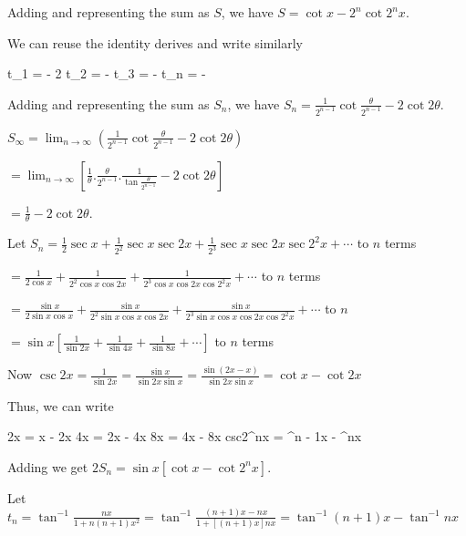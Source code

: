   Adding and representing the sum as $S$, we have $S = \cot x - 2^n\cot2^nx$.
\item We can reuse the identity derives and write similarly

  \startformula\startalign
    \NC t_1 \NC = \cot\theta - 2\theta\NR
    \NC t_2 \NC = \cot{} - \cot\theta\NR
    \NC t_3 \NC = \cot{} - \cot{}\NR
    \NC \NC \cdots\NR
    \NC t_n \NC = \cot{} - \cot{}\NR
  \stopalign\stopformula

  Adding and representing the sum as $S_n$, we have $S_n = \frac{1}{2^{n - 1}}\cot\frac{\theta}{2^{n - 1}} -
  2\cot2\theta$.

  $\displaystyle S_\infty = \lim_{n\to\infty}\left(\frac{1}{2^{n - 1}}\cot\frac{\theta}{2^{n - 1}} -
  2\cot2\theta\right)$

  $= \lim_{n\to\infty}\left[\frac{1}{\theta}.\frac{\theta}{2^{n - 1}}.\frac{1}{\tan\frac{\theta}{2^{n - 1}}}
    - 2\cot2\theta\right]$

  $= \frac{1}{\theta} - 2\cot2\theta$.
\item Let $S_n = \frac{1}{2}\sec x + \frac{1}{2^2}\sec x\sec2x + \frac{1}{2^3}\sec x\sec2x\sec2^2x +
  \cdots$ to $n$ terms

  $= \frac{1}{2\cos x} + \frac{1}{2^2\cos x\cos2x} + \frac{1}{2^3\cos x\cos2x\cos2^2x} + \cdots$ to $n$
  terms

  $= \frac{\sin x}{2\sin x\cos x} + \frac{\sin x}{2^2\sin x\cos x\cos2x} + \frac{\sin x}{2^3\sin x\cos
    x\cos2x\cos2^2x} + \cdots$ to $n$

  $= \sin x\left[\frac{1}{\sin 2x} + \frac{1}{\sin 4x} + \frac{1}{\sin 8x} + \cdots\right]$ to $n$ terms

  Now $\csc2x = \frac{1}{\sin2x} = \frac{\sin x}{\sin2x\sin x} = \frac{\sin(2x - x)}{\sin 2x\sin x} = \cot x
  - \cot 2x$

  Thus, we can write

  \startformula\startalign
    \NC \csc2x \NC = \cot x - \cot2x\NR
    \NC \csc4x \NC = \cot2x - \cot4x\NR
    \NC \csc8x \NC = \cot4x - \cot8x\NR
    \NC \NC \cdots\NR
    \NC csc2^nx \NC = ^{n - 1}x - ^nx\NR
  \stopalign\stopformula

  Adding we get $2S_n = \sin x[\cot x - \cot2^nx]$.
\item Let $t_n = \tan^{-1}\frac{nx}{1 + n(n + 1)x^2} = \tan^{-1}\frac{(n + 1)x - nx}{1 + [(n + 1)x]nx} =
  \tan^{-1}(n + 1)x - \tan^{-1}nx$

